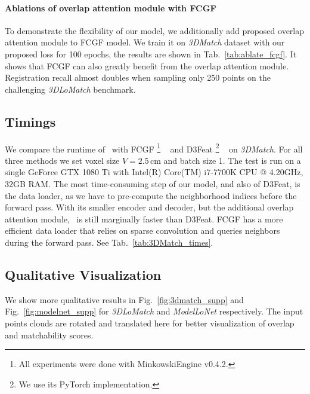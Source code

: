 
\paragraph{Ablations of overlap attention module with FCGF}
To demonstrate the flexibility of our model, we additionally add proposed overlap attention module to FCGF model. We train it on \emph{3DMatch} dataset with our proposed loss for 100 epochs, the results are shown in Tab.~\ref{tab:ablate_fcgf}. It shows that FCGF can also greatly beneﬁt from the overlap attention module. Registration recall almost doubles when sampling only 250 points on the challenging \emph{3DLoMatch} benchmark. 


\subsection{Timings}
\label{sec:timing}

We compare the runtime of \acro\ with FCGF%
\footnote{All experiments were done with MinkowskiEngine v0.4.2.} %
~\cite{Choy2019FCGF} and D3Feat%
\footnote{We use its PyTorch implementation.} %
~\cite{bai2020d3feat} on \emph{3DMatch}. For all three methods we set voxel size $V\!=\!2.5\,$cm and batch size 1. The test is run on a single GeForce GTX 1080 Ti with Intel(R) Core(TM) i7-7700K CPU @ 4.20GHz, 32GB RAM. The most time-consuming step of our model, and also of D3Feat, is the data loader, as we have to pre-compute the neighborhood indices before the forward pass. With its smaller encoder and decoder, but the additional overlap attention module, \acro\ is still marginally faster than D3Feat. FCGF has a more efficient data loader that relies on sparse convolution and queries neighbors during the forward pass. See Tab.~\ref{tab:3DMatch_times}.

\subsection{Qualitative Visualization}
\label{sec:qualitative_supp}
We show more qualitative results in Fig.~\ref{fig:3dmatch_supp} and Fig.~\ref{fig:modelnet_supp} for \emph{3DLoMatch} and \emph{ModelLoNet} respectively. The input points clouds are rotated and translated here for better visualization of overlap and matchability scores. 







